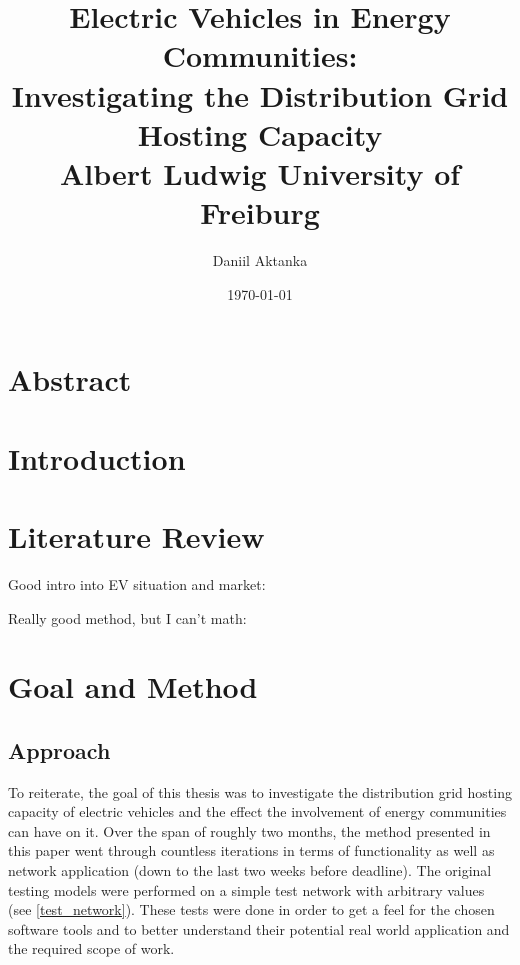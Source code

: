 \documentclass[a4paper,10pt]{report}
\begin{document}
\title{
	\vspace{2cm}
	{\LARGE Electric Vehicles in Energy Communities:}\\
	{\Large Investigating the Distribution Grid Hosting Capacity} \\[2cm]
	{\large Albert Ludwig University of Freiburg}
}
\author{
	\Large Daniil Aktanka
}
\date{
	\normalsize \today
}
\maketitle
\thispagestyle{empty}


\chapter*{Abstract}



\listoftables
{}
\cleardoublepage

\listoffigures
{}
\cleardoublepage

\tableofcontents\cleardoublepage



\chapter{Introduction}
\chapter{Literature Review}\label{section_literature_review}
Good intro into EV situation and market: \cite{Das2020}

Really good method, but I can't math: \cite{Gruosso2019}

\chapter{Goal and Method}
\section{Approach}\label{section_approach}
To reiterate, the goal of this thesis was to investigate the distribution grid hosting capacity of electric vehicles and the effect the involvement of energy communities can have on it. Over the span of roughly two months, the method presented in this paper went through countless iterations in terms of functionality as well as network application (down to the last two weeks before deadline). The original testing models were performed on a simple test network with arbitrary values (see \cref{test_network}). These tests were done in order to get a feel for the chosen software tools and to better understand their potential real world application and the required scope of work.
\end{document}
